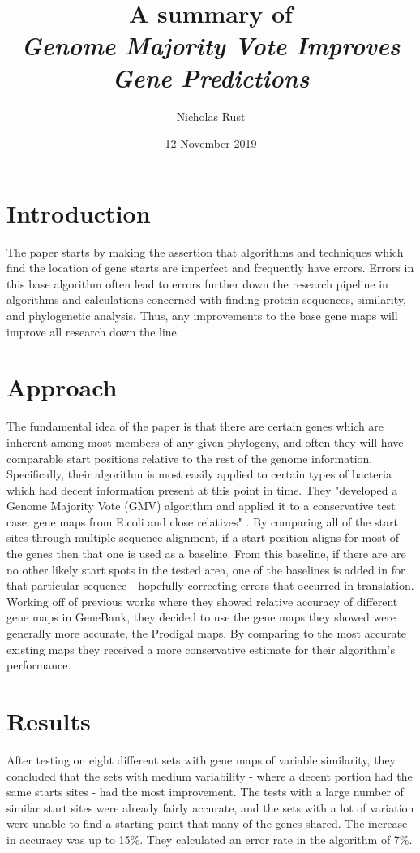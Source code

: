 \documentclass{article}
\title{A summary of\\ \textit{Genome Majority Vote Improves Gene Predictions}\cite{Geno2011}}
\author{Nicholas Rust}
\date{12 November 2019}
\begin{document}
\maketitle

\section{Introduction}
The paper starts by making the assertion that algorithms and techniques which find the location of gene starts are imperfect and frequently have errors. Errors in this base algorithm often lead to errors further down the research pipeline in algorithms and calculations concerned with finding protein sequences, similarity, and phylogenetic analysis. Thus, any improvements to the base gene maps will improve all research down the line.

\section{Approach}
The fundamental idea of the paper is that there are certain genes which are inherent among most members of any given phylogeny, and often they will have comparable start positions relative to the rest of the genome information. Specifically, their algorithm is most easily applied to certain types of bacteria which had decent information present at this point in time. They "developed a Genome Majority Vote (GMV) algorithm and applied it to a conservative test case: gene maps from E.coli and close relatives" \cite{Geno2011}. By comparing all of the start sites through multiple sequence alignment, if a start position aligns for most of the genes then that one is used as a baseline. From this baseline, if there are are no other likely start spots in the tested area, one of the baselines is added in for that particular sequence - hopefully correcting errors that occurred in translation.
	Working off of previous works where they showed relative accuracy of different gene maps in GeneBank, they decided to use the gene maps they showed were generally more accurate, the Prodigal maps. By comparing to the most accurate existing maps they received a more conservative estimate for their algorithm's performance.
	
\section{Results}
After testing on eight different sets with gene maps of variable similarity, they concluded that the sets with medium variability - where a decent portion had the same starts sites - had the most improvement. The tests with a large number of similar start sites were already fairly accurate, and the sets with a lot of variation were unable to find a starting point that many of the genes shared. The increase in accuracy was up to 15\%. They calculated an error rate in the algorithm of 7\%.
\end{document}
